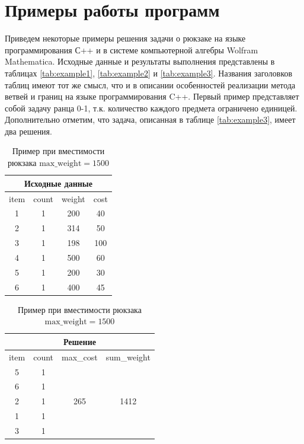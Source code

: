 \documentclass[12pt, a4paper]{article}
\begin{document}
	\section{Примеры работы программ}
	Приведем некоторые примеры решения задачи о рюкзаке на языке программирования С++ и в системе компьютерной алгебры Wolfram Mathematica. Исходные данные и результаты выполнения представлены в таблицах \eqref{tab:example1}, \eqref{tab:example2} и \eqref{tab:example3}. Названия заголовков таблиц имеют тот же смысл, что и в описании особенностей реализации метода ветвей и границ на языке программирования C++. Первый пример представляет собой задачу ранца 0-1, т.к. количество каждого предмета ограничено единицей. Дополнительно отметим, что задача, описанная в таблице \eqref{tab:example3}, имеет два решения.
		\begin{table}[H]
		\small
		\centering		
		\caption{Пример при вместимости рюкзака $\textrm{max\_weight}=1500$}\medskip
		\begin{tabular}{|c|c|c|c|}
			\hline
			\multicolumn{4}{|c|}{\textbf{Исходные данные}}\\
			\hline
			\rowcolor{Gray}
			item & count & weight & cost \\
			\hline
			1 & 1 & 200 & 40 \\
			\hline
			2 & 1 & 314 & 50 \\
			\hline
			3 & 1 & 198 & 100 \\
			\hline
			4 & 1 & 500 & 60 \\
			\hline
			5 & 1 & 200 & 30 \\
			\hline
			6 & 1 & 400 & 45\\
			\hline
		\end{tabular}
		\qquad
		\begin{tabular}{|c|c|c|c|}
			\hline
			\multicolumn{4}{|c|}{\textbf{Решение}}\\
			\hline
			\rowcolor{Gray}
			item & count & max\_cost & sum\_weight \\
			\hline
			5 & 1 & \multirow{5}{*}{\large 265} & \multirow{5}{*}{\large 1412} \\
			\cline{1-2}
			6 & 1 &  &  \\
			\cline{1-2}
			2 & 1 &  &  \\
			\cline{1-2}
			1 & 1 &  &  \\
			\cline{1-2}
			3 & 1 &  &  \\
			\hline
		\end{tabular}
		\label{tab:example1}
	\end{table}	
\end{document}
